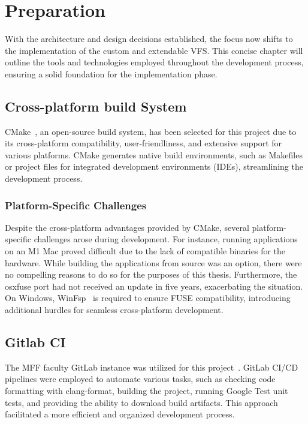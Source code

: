 \chapter{Preparation}
\label{chap:preparation}

With the architecture and design decisions established, the focus now shifts to the implementation of the custom and extendable VFS.
This concise chapter will outline the tools and technologies employed throughout the development process, ensuring a solid foundation for the implementation phase.


\section{Cross-platform build System}\label{sec:build-system-and-cross-platform-challenges}

CMake~\cite{cmake}, an open-source build system, has been selected for this project due to its cross-platform compatibility, user-friendliness, and extensive support for various platforms.
CMake generates native build environments, such as Makefiles or project files for integrated development environments (IDEs), streamlining the development process.

\subsection{Platform-Specific Challenges}\label{subsec:platform-specific-challenges}

Despite the cross-platform advantages provided by CMake, several platform-specific challenges arose during development.
For instance, running applications on an M1 Mac proved difficult due to the lack of compatible binaries for the hardware.
While building the applications from source was an option, there were no compelling reasons to do so for the purposes of this thesis.
Furthermore, the osxfuse port had not received an update in five years, exacerbating the situation.
On Windows, WinFsp~\cite{winfsp} is required to ensure FUSE compatibility, introducing additional hurdles for seamless cross-platform development.


\section{Gitlab CI}\label{sec:gitlab-ci}

The MFF faculty GitLab instance was utilized for this project~\cite{gitlab_mff}.
GitLab CI/CD pipelines were employed to automate various tasks, such as checking code formatting with clang-format, building the project, running Google Test unit tests, and providing the ability to download build artifacts.
This approach facilitated a more efficient and organized development process.

